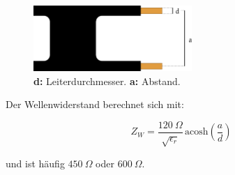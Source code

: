 \begin{figure}[h!]
 \centering
 \includegraphics[width=6cm]{./png/Bandleitung.png}
 \caption{\textbf{d:} Leiterdurchmesser. \textbf{a:} Abstand.}
 \label{fig:bandleitung}
\end{figure}


Der Wellenwiderstand berechnet sich mit:

\[Z_W = \frac{120~\Omega}{\sqrt{\epsilon_r}}\, \mathrm{acosh} \left ( \frac{a}{d} \right ) \]

und ist häufig $450~\Omega$ oder $600~\Omega$.



